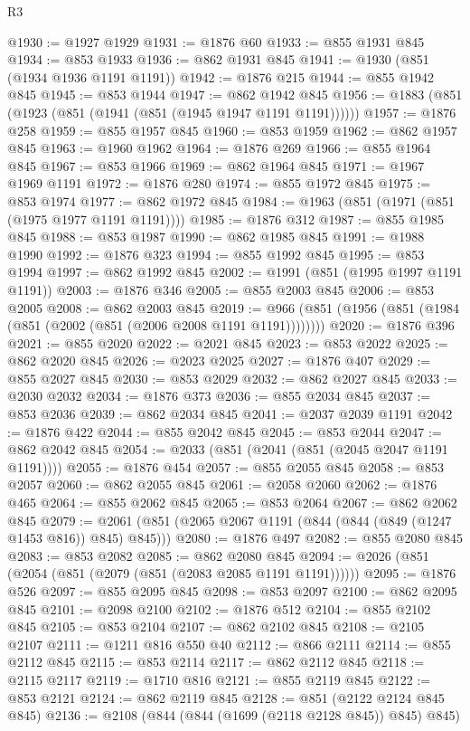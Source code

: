 \begin{lexlean}{R3}
\begin{coremodule}
@1930 := @1927 @1929
@1931 := @1876 @60
@1933 := @855 @1931 @845
@1934 := @853 @1933
@1936 := @862 @1931 @845
@1941 := @1930 (@851 (@1934 @1936 @1191 @1191))
@1942 := @1876 @215
@1944 := @855 @1942 @845
@1945 := @853 @1944
@1947 := @862 @1942 @845
@1956 := @1883 (@851 (@1923 (@851 (@1941 (@851 (@1945 @1947 @1191 @1191))))))
@1957 := @1876 @258
@1959 := @855 @1957 @845
@1960 := @853 @1959
@1962 := @862 @1957 @845
@1963 := @1960 @1962
@1964 := @1876 @269
@1966 := @855 @1964 @845
@1967 := @853 @1966
@1969 := @862 @1964 @845
@1971 := @1967 @1969 @1191
@1972 := @1876 @280
@1974 := @855 @1972 @845
@1975 := @853 @1974
@1977 := @862 @1972 @845
@1984 := @1963 (@851 (@1971 (@851 (@1975 @1977 @1191 @1191))))
@1985 := @1876 @312
@1987 := @855 @1985 @845
@1988 := @853 @1987
@1990 := @862 @1985 @845
@1991 := @1988 @1990
@1992 := @1876 @323
@1994 := @855 @1992 @845
@1995 := @853 @1994
@1997 := @862 @1992 @845
@2002 := @1991 (@851 (@1995 @1997 @1191 @1191))
@2003 := @1876 @346
@2005 := @855 @2003 @845
@2006 := @853 @2005
@2008 := @862 @2003 @845
@2019 := @966 (@851 (@1956 (@851 (@1984 (@851 (@2002 (@851 (@2006 @2008 @1191 @1191))))))))
@2020 := @1876 @396
@2021 := @855 @2020
@2022 := @2021 @845
@2023 := @853 @2022
@2025 := @862 @2020 @845
@2026 := @2023 @2025
@2027 := @1876 @407
@2029 := @855 @2027 @845
@2030 := @853 @2029
@2032 := @862 @2027 @845
@2033 := @2030 @2032
@2034 := @1876 @373
@2036 := @855 @2034 @845
@2037 := @853 @2036
@2039 := @862 @2034 @845
@2041 := @2037 @2039 @1191
@2042 := @1876 @422
@2044 := @855 @2042 @845
@2045 := @853 @2044
@2047 := @862 @2042 @845
@2054 := @2033 (@851 (@2041 (@851 (@2045 @2047 @1191 @1191))))
@2055 := @1876 @454
@2057 := @855 @2055 @845
@2058 := @853 @2057
@2060 := @862 @2055 @845
@2061 := @2058 @2060
@2062 := @1876 @465
@2064 := @855 @2062 @845
@2065 := @853 @2064
@2067 := @862 @2062 @845
@2079 := @2061 (@851 (@2065 @2067 @1191 (@844 (@844 (@849 (@1247 @1453 @816)) @845) @845)))
@2080 := @1876 @497
@2082 := @855 @2080 @845
@2083 := @853 @2082
@2085 := @862 @2080 @845
@2094 := @2026 (@851 (@2054 (@851 (@2079 (@851 (@2083 @2085 @1191 @1191))))))
@2095 := @1876 @526
@2097 := @855 @2095 @845
@2098 := @853 @2097
@2100 := @862 @2095 @845
@2101 := @2098 @2100
@2102 := @1876 @512
@2104 := @855 @2102 @845
@2105 := @853 @2104
@2107 := @862 @2102 @845
@2108 := @2105 @2107
@2111 := @1211 @816 @550 @40
@2112 := @866 @2111
@2114 := @855 @2112 @845
@2115 := @853 @2114
@2117 := @862 @2112 @845
@2118 := @2115 @2117
@2119 := @1710 @816
@2121 := @855 @2119 @845
@2122 := @853 @2121
@2124 := @862 @2119 @845
@2128 := @851 (@2122 @2124 @845 @845)
@2136 := @2108 (@844 (@844 (@1699 (@2118 @2128 @845)) @845) @845)

\end{coremodule}
\end{lexlean}
